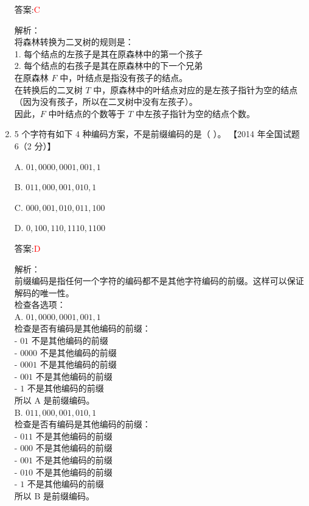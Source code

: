 \documentclass[lang=cn,newtx,10pt,scheme=chinese]{../../../elegantbook}
\begin{document}
\begin{enumerate}
        答案:\textcolor{red}{C}
        
        解析：\\
        将森林转换为二叉树的规则是：\\
        1. 每个结点的左孩子是其在原森林中的第一个孩子\\
        2. 每个结点的右孩子是其在原森林中的下一个兄弟\\
        
        在原森林 $F$ 中，叶结点是指没有孩子的结点。\\
        
        在转换后的二叉树 $T$ 中，原森林中的叶结点对应的是左孩子指针为空的结点（因为没有孩子，所以在二叉树中没有左孩子）。\\
        
        因此，$F$ 中叶结点的个数等于 $T$ 中左孩子指针为空的结点个数。\\
    
        \item 5 个字符有如下 4 种编码方案，不是前缀编码的是（ ）。  
        【2014 年全国试题 6（2 分）】  
    
        A. $01, 0000, 0001, 001, 1$  
    
        B. $011, 000, 001, 010, 1$ 
    
        C. $000, 001, 010, 011, 100$  
    
        D. $0, 100, 110, 1110, 1100$  
    
        答案:\textcolor{red}{D}
        
        解析：\\
        前缀编码是指任何一个字符的编码都不是其他字符编码的前缀。这样可以保证解码的唯一性。\\
        
        检查各选项：\\
        
        A. $01, 0000, 0001, 001, 1$\\
        检查是否有编码是其他编码的前缀：\\
        - $01$ 不是其他编码的前缀\\
        - $0000$ 不是其他编码的前缀\\
        - $0001$ 不是其他编码的前缀\\
        - $001$ 不是其他编码的前缀\\
        - $1$ 不是其他编码的前缀\\
        所以 A 是前缀编码。\\
        
        B. $011, 000, 001, 010, 1$\\
        检查是否有编码是其他编码的前缀：\\
        - $011$ 不是其他编码的前缀\\
        - $000$ 不是其他编码的前缀\\
        - $001$ 不是其他编码的前缀\\
        - $010$ 不是其他编码的前缀\\
        - $1$ 不是其他编码的前缀\\
        所以 B 是前缀编码。\\
        

\end{enumerate}
\end{document}
